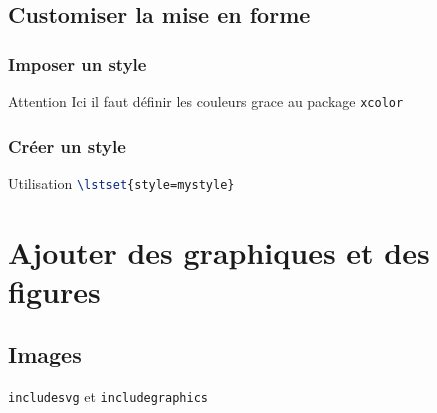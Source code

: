 \documentclass{beamer}
\begin{document}
    \subsection{Customiser la mise en forme}
    \begin{frame}
        \frametitle{Imposer un style}
        
        \begin{alertblock}{Attention}
            Ici il faut définir les couleurs grace au package \texttt{xcolor}
        \end{alertblock}
    \end{frame}
    \begin{frame}[allowframebreaks=1,fragile,t]
        \frametitle{Créer un style}
        
        \begin{block}{Utilisation}
            \lstinline[language=tex]!\lstset{style=mystyle}!
        \end{block}
    \end{frame}

    \section{Ajouter des graphiques et des figures}
    \subsection{Images}
    \begin{frame}
        \centering
        
        \begin{block}{\texttt{includesvg} et \texttt{includegraphics}}
            
        \end{block}
    \end{frame}
\end{document}
